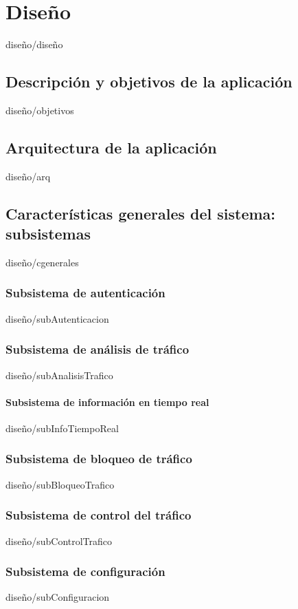\documentclass[epsbased,copyright,final,printable,covers,extendedindex,firstnumbered,tfg,gnuplot]{tfgtfmthesisuam}
\begin{document}
    

\chapter{Diseño\label{CAP:DISEÑO}}{diseño/diseño}
    \section{Descripción y objetivos de la aplicación\label{SEC:DOBJETIVOS}}{diseño/objetivos}
    \section{Arquitectura de la aplicación\label{SEC:Darq}}{diseño/arq}
    \section{Características generales del sistema: subsistemas\label{SEC:CGENERALES}}{diseño/cgenerales}
         \subsection{Subsistema de autenticación\label{SEC:subAutenticacion}}{diseño/subAutenticacion}
        \subsection{Subsistema de análisis de tráfico\label{SEC:subAnalisisTrafico}}{diseño/subAnalisisTrafico}
            \subsubsection{Subsistema de información en tiempo real\label{SEC:subInfoTiempoReal}}{diseño/subInfoTiempoReal}
        \subsection{Subsistema de bloqueo de tráfico\label{SEC:subBloqueoTrafico}}{diseño/subBloqueoTrafico}
        \subsection{Subsistema de control del tráfico\label{SEC:subControlTrafico}}{diseño/subControlTrafico}
        \subsection{Subsistema de configuración\label{SEC:subConfiguracion}}{diseño/subConfiguracion}
\end{document}
